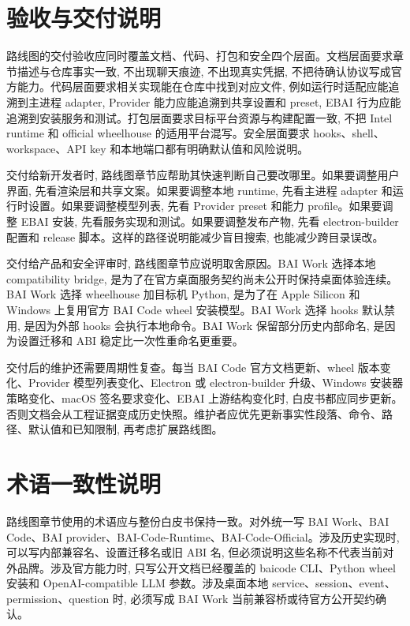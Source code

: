 \section{验收与交付说明}
路线图的交付验收应同时覆盖文档、代码、打包和安全四个层面。文档层面要求章节描述与仓库事实一致, 不出现聊天痕迹, 不出现真实凭据, 不把待确认协议写成官方能力。代码层面要求相关实现能在仓库中找到对应文件, 例如运行时适配应能追溯到主进程 adapter, Provider 能力应能追溯到共享设置和 preset, EBAI 行为应能追溯到安装服务和测试。打包层面要求目标平台资源与构建配置一致, 不把 Intel runtime 和 official wheelhouse 的适用平台混写。安全层面要求 hooks、shell、workspace、API key 和本地端口都有明确默认值和风险说明。

交付给新开发者时, 路线图章节应帮助其快速判断自己要改哪里。如果要调整用户界面, 先看渲染层和共享文案。如果要调整本地 runtime, 先看主进程 adapter 和运行时设置。如果要调整模型列表, 先看 Provider preset 和能力 profile。如果要调整 EBAI 安装, 先看服务实现和测试。如果要调整发布产物, 先看 electron-builder 配置和 release 脚本。这样的路径说明能减少盲目搜索, 也能减少跨目录误改。

交付给产品和安全评审时, 路线图章节应说明取舍原因。BAI Work 选择本地 compatibility bridge, 是为了在官方桌面服务契约尚未公开时保持桌面体验连续。BAI Work 选择 wheelhouse 加目标机 Python, 是为了在 Apple Silicon 和 Windows 上复用官方 BAI Code wheel 安装模型。BAI Work 选择 hooks 默认禁用, 是因为外部 hooks 会执行本地命令。BAI Work 保留部分历史内部命名, 是因为设置迁移和 ABI 稳定比一次性重命名更重要。

交付后的维护还需要周期性复查。每当 BAI Code 官方文档更新、wheel 版本变化、Provider 模型列表变化、Electron 或 electron-builder 升级、Windows 安装器策略变化、macOS 签名要求变化、EBAI 上游结构变化时, 白皮书都应同步更新。否则文档会从工程证据变成历史快照。维护者应优先更新事实性段落、命令、路径、默认值和已知限制, 再考虑扩展路线图。

\section{术语一致性说明}
路线图章节使用的术语应与整份白皮书保持一致。对外统一写 BAI Work、BAI Code、BAI provider、BAI-Code-Runtime、BAI-Code-Official。涉及历史实现时, 可以写内部兼容名、设置迁移名或旧 ABI 名, 但必须说明这些名称不代表当前对外品牌。涉及官方能力时, 只写公开文档已经覆盖的 baicode CLI、Python wheel 安装和 OpenAI-compatible LLM 参数。涉及桌面本地 service、session、event、permission、question 时, 必须写成 BAI Work 当前兼容桥或待官方公开契约确认。

